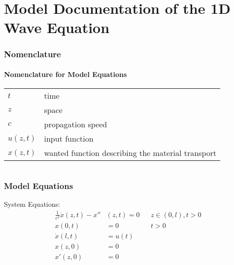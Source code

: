 \documentclass[10pt,a4paper]{article}
\begin{document}
	\part*{Model Documentation of the 1D Wave Equation} %
	
	
	\section{Nomenclature} %
	\subsection{Nomenclature for Model Equations} %
	
	\begin{tabular}{ll}
		$t$ & time \\
		$z$ & space \\
		$c$ & propagation speed \\
		$u(z, t)$ & input function \\
		$x(z, t)$ & wanted function describing the material transport
				
	\end{tabular}
	 
	
	\begin{tabular}{ll}

	\end{tabular}
	
	
	\section{Model Equations} %
	
	\noindent System Equations:			
	\begin{subequations}
	\begin{align*}
		\frac{1}{c^2}\ddot{x}(z,t) -  x''&(z,t) = 0 && z\in (0, l), t>0\\
		x(0,t) &= 0 && t>0\\
		\dot{x}(l, t) &= u(t)\\
		x(z,0) &=0\\
		x'(z,0) &=0
	\end{align*}
	\end{subequations}
\end{document}
